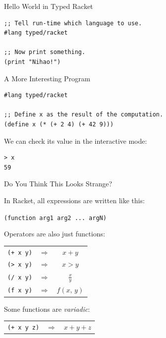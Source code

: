 \documentclass{beamer}
\begin{document}
\begin{frame}[fragile]{Hello World in Typed Racket}
\begin{center}
\begin{lstlisting}
;; Tell run-time which language to use.
#lang typed/racket

;; Now print something.
(print "Nihao!")
\end{lstlisting}
\end{center}
\end{frame}

\begin{frame}[fragile]{A More Interesting Program}
\begin{lstlisting}
#lang typed/racket

;; Define x as the result of the computation.
(define x (* (+ 2 4) (+ 42 9)))
\end{lstlisting}

\pause{}

We can check its value in the interactive mode:

\begin{lstlisting}
> x
59
\end{lstlisting}

\end{frame}

\begin{frame}[fragile]{Do You Think This Looks Strange?}

  In Racket, all expressions are written like this:

  \begin{center}
    \lstinline{(function arg1 arg2 ... argN)}
  \end{center}

  \pause{}

  Operators are also just functions:

  \begin{center}
    \begin{tabular}{ccc}
      \lstinline{(+ x y)} & $\Rightarrow$ & $x + y$ \\
      \lstinline{(> x y)} & $\Rightarrow$ & $x > y$ \\
      \lstinline{(/ x y)} & $\Rightarrow$ & $\frac{x}{y}$ \\
      \lstinline{(f x y)} & $\Rightarrow$ & $f(x, \, y)$
    \end{tabular}
  \end{center}

  \pause{}

  Some functions are \textit{variadic}:

  \begin{center}
    \begin{tabular}{ccc}
      \lstinline{(+ x y z)} & $\Rightarrow$ & $x + y + z$
    \end{tabular}
  \end{center}

\end{frame}
\end{document}
